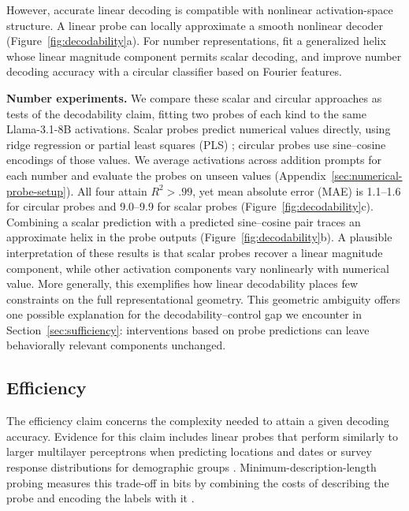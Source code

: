 \documentclass[11pt]{article}
\begin{document}
However, accurate linear decoding is compatible with nonlinear activation-space structure.
A linear probe can locally approximate a smooth nonlinear decoder (Figure~\ref{fig:decodability}a).
For number representations, \citet{kantamneni2025trigonometry} fit a generalized helix whose linear magnitude component permits scalar decoding, and \citet{kadlcik2025accurate} improve number decoding accuracy with a circular classifier based on Fourier features.

\begingroup
{}
\textbf{Number experiments.} We compare these scalar and circular approaches as tests of the decodability claim, fitting two probes of each kind to the same Llama-3.1-8B activations.
Scalar probes predict numerical values directly, using ridge regression or partial least squares (PLS) \citep{wold2001pls,heinzerling2024monotonic}; circular probes use sine--cosine encodings of those values.
We average activations across addition prompts for each number and evaluate the probes on unseen values (Appendix~\ref{sec:numerical-probe-setup}).
All four attain $R^2>.99$, yet mean absolute error (MAE) is 1.1--1.6 for circular probes and 9.0--9.9 for scalar probes (Figure~\ref{fig:decodability}c).
Combining a scalar prediction with a predicted sine--cosine pair traces an approximate helix in the probe outputs (Figure~\ref{fig:decodability}b).
A plausible interpretation of these results is that scalar probes recover a linear magnitude component, while other activation components vary nonlinearly with numerical value.
More generally, this exemplifies how linear decodability places few constraints on the full representational geometry.
This geometric ambiguity offers one possible explanation for the decodability--control gap we encounter in Section~\ref{sec:sufficiency}: interventions based on probe predictions can leave behaviorally relevant components unchanged.
\par
\endgroup

\subsection{Efficiency}

The efficiency claim concerns the complexity needed to attain a given decoding accuracy.
Evidence for this claim includes linear probes that perform similarly to larger multilayer perceptrons when predicting locations and dates \citep{gurnee2023language} or survey response distributions for demographic groups \citep{jahanparast2026opinions}.
Minimum-description-length probing measures this trade-off in bits by combining the costs of describing the probe and encoding the labels with it \citep{voita2020information}.
\end{document}
